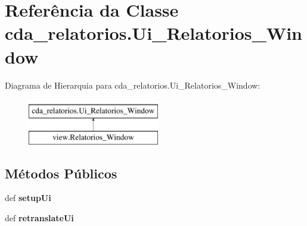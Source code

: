 \hypertarget{classcda__relatorios_1_1Ui__Relatorios__Window}{\section{\-Referência da \-Classe cda\-\_\-relatorios.\-Ui\-\_\-\-Relatorios\-\_\-\-Window}
\label{classcda__relatorios_1_1Ui__Relatorios__Window}
}
\-Diagrama de \-Hierarquia para cda\-\_\-relatorios.\-Ui\-\_\-\-Relatorios\-\_\-\-Window\-:\begin{figure}[H]
\begin{center}
\leavevmode
\includegraphics[height=2.000000cm]{classcda__relatorios_1_1Ui__Relatorios__Window}
\end{center}
\end{figure}
\subsection*{\-Métodos \-Públicos}
\begin{DoxyCompactItemize}
\item 
\hypertarget{classcda__relatorios_1_1Ui__Relatorios__Window_ac64f7243820048aebacca442e03e0862}{def {\bfseries setup\-Ui}}\label{classcda__relatorios_1_1Ui__Relatorios__Window_ac64f7243820048aebacca442e03e0862}

\item 
\hypertarget{classcda__relatorios_1_1Ui__Relatorios__Window_a1aeebc39fd2cdba75ce3642c827bf26e}{def {\bfseries retranslate\-Ui}}\label{classcda__relatorios_1_1Ui__Relatorios__Window_a1aeebc39fd2cdba75ce3642c827bf26e}

\end{DoxyCompactItemize}
